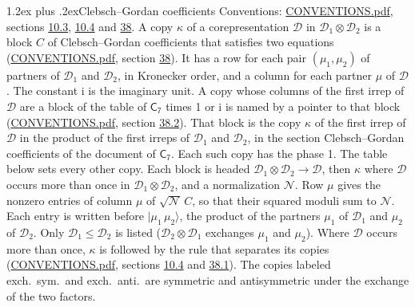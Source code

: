 \documentclass[10pt,a4paper]{article}
\makeatletter
\renewcommand\section{\@startsection{section}{1}{\z@}{-3ex plus -1ex minus -.2ex}%
  {1.2ex plus .2ex}{\normalfont\large\sffamily\bfseries\color{parttitle}}}
\numberwithin{equation}{section}
\newcommand{\grp}[1]{\mathsf{#1}}
\newcommand{\iunit}{\mathrm{i}}
\newcommand{\irrprod}{\otimes}
\newcommand{\mult}{\kappa}
\newcommand{\intx}{\mu}
\newcommand{\cgnorm}{\mathcal{N}}
\newcommand{\prodket}[2]{\lvert {#1}\,{#2}\rangle}
\makeatother
\begin{document}
\section{Clebsch--Gordan coefficients}\label{s:clebsch_gordan}
Conventions: \href{../../CONVENTIONS.pdf}{CONVENTIONS.pdf}, sections \href{../../../rotation/CONVENTIONS.pdf\#conv.10.3}{10.3}, \href{../../../rotation/CONVENTIONS.pdf\#conv.10.4}{10.4} and \href{../../CONVENTIONS.pdf\#conv.38}{38}.
\leavevmode\label{n:index.copy}\label{n:matrix.cg.stored}A copy $\mult$ of a corepresentation $\mathcal{D}$ in $\mathcal{D}_1\irrprod\mathcal{D}_2$ is a block $C$ of Clebsch--Gordan coefficients that satisfies two equations (\href{../../CONVENTIONS.pdf}{CONVENTIONS.pdf}, section \href{../../CONVENTIONS.pdf\#conv.38}{38}). \label{n:index.cg}It has a row for each pair $(\intx_1, \intx_2)$ of partners of $\mathcal{D}_1$ and $\mathcal{D}_2$, in Kronecker order, and a column for each partner $\intx$ of $\mathcal{D}$.
The constant $\iunit$ is the imaginary unit.
A copy whose columns of the first irrep of $\mathcal{D}$ are a block of the table of $\grp{C_{7}}$ times 1 or $\iunit$ is named by a pointer to that block (\href{../../CONVENTIONS.pdf}{CONVENTIONS.pdf}, section \href{../../CONVENTIONS.pdf\#conv.38.2}{38.2}). That block is the copy $\mult$ of the first irrep of $\mathcal{D}$ in the product of the first irreps of $\mathcal{D}_1$ and $\mathcal{D}_2$, in the section Clebsch--Gordan coefficients of the document of \href{../../../rotation/data/pdf/C7.pdf}{$\grp{C_{7}}$}. Each such copy has the phase 1. The table below sets every other copy.
Each block is headed $\mathcal{D}_1\irrprod\mathcal{D}_2\to\mathcal{D}$, then $\mult$ where $\mathcal{D}$ occurs more than once in $\mathcal{D}_1\irrprod\mathcal{D}_2$, and a normalization $\cgnorm$. Row $\intx$ gives the nonzero entries of column $\intx$ of $\sqrt{\cgnorm}\,C$, so that their squared moduli sum to $\cgnorm$. \label{n:vector.ket.product}Each entry is written before $\prodket{\intx_1}{\intx_2}$, the product of the partners $\intx_1$ of $\mathcal{D}_1$ and $\intx_2$ of $\mathcal{D}_2$. Only $\mathcal{D}_1 \le \mathcal{D}_2$ is listed ($\mathcal{D}_2\irrprod\mathcal{D}_1$ exchanges $\intx_1$ and $\intx_2$).
Where $\mathcal{D}$ occurs more than once, $\mult$ is followed by the rule that separates its copies (\href{../../CONVENTIONS.pdf}{CONVENTIONS.pdf}, sections \href{../../../rotation/CONVENTIONS.pdf\#conv.10.4}{10.4} and \href{../../CONVENTIONS.pdf\#conv.38.1}{38.1}). \label{n:abbreviation.exchange}The copies labeled exch.\ sym.\ and exch.\ anti.\ are symmetric and antisymmetric under the exchange of the two factors.
\end{document}
